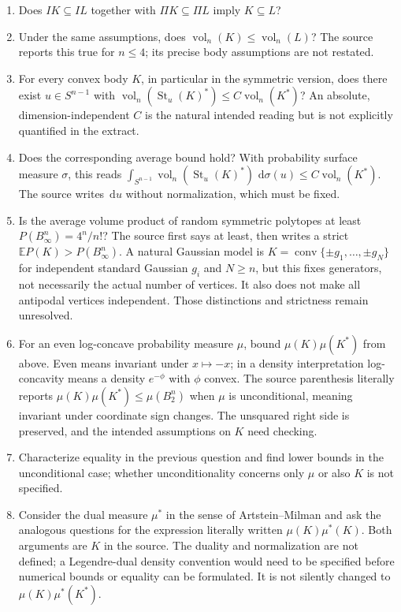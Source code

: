 \documentclass[11pt]{article}
\newcommand{\E}{\mathbb{E}}
\newcommand{\dd}{\,\mathrm{d}}
\begin{document}
\begin{enumerate}
\item Does $IK\subseteq IL$ together with $\Pi K\subseteq\Pi L$ imply $K\subseteq L$?
\item Under the same assumptions, does $\operatorname{vol}_n(K)\leq\operatorname{vol}_n(L)$? The source reports this true for $n\leq4$; its precise body assumptions are not restated.
\item For every convex body $K$, in particular in the symmetric version, does there exist $u\in S^{n-1}$ with $\operatorname{vol}_n(\operatorname{St}_u(K)^*)\leq C\operatorname{vol}_n(K^*)$? An absolute, dimension-independent $C$ is the natural intended reading but is not explicitly quantified in the extract.
\item Does the corresponding average bound hold? With probability surface measure $\sigma$, this reads $\int_{S^{n-1}}\operatorname{vol}_n(\operatorname{St}_u(K)^*)\,\dd\sigma(u)\leq C\operatorname{vol}_n(K^*)$. The source writes $\dd u$ without normalization, which must be fixed.
\item Is the average volume product of random symmetric polytopes at least $P(B_\infty^n)=4^n/n!$? The source first says at least, then writes a strict $\E P(K)>P(B_\infty^n)$. A natural Gaussian model is $K=\operatorname{conv}\{\pm g_1,\ldots,\pm g_N\}$ for independent standard Gaussian $g_i$ and $N\geq n$, but this fixes generators, not necessarily the actual number of vertices. It also does not make all antipodal vertices independent. Those distinctions and strictness remain unresolved.
\item For an even log-concave probability measure $\mu$, bound $\mu(K)\mu(K^*)$ from above. Even means invariant under $x\mapsto-x$; in a density interpretation log-concavity means a density $e^{-\phi}$ with $\phi$ convex. The source parenthesis literally reports $\mu(K)\mu(K^*)\leq\mu(B_2^n)$ when $\mu$ is unconditional, meaning invariant under coordinate sign changes. The unsquared right side is preserved, and the intended assumptions on $K$ need checking.
\item Characterize equality in the previous question and find lower bounds in the unconditional case; whether unconditionality concerns only $\mu$ or also $K$ is not specified.
\item Consider the dual measure $\mu^*$ in the sense of Artstein--Milman and ask the analogous questions for the expression literally written $\mu(K)\mu^*(K)$. Both arguments are $K$ in the source. The duality and normalization are not defined; a Legendre-dual density convention would need to be specified before numerical bounds or equality can be formulated. It is not silently changed to $\mu(K)\mu^*(K^*)$.

\end{enumerate}
\end{document}

